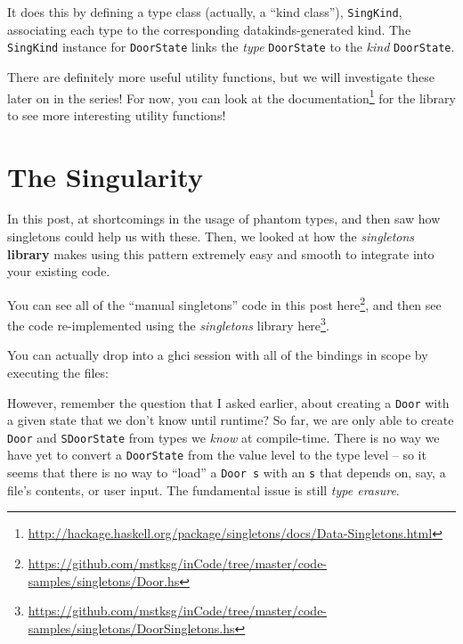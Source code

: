 \documentclass[]{article}
\newenvironment{Shaded}{}{}
\newcommand{\ExtensionTok}[1]{#1}
\newcommand{\NormalTok}[1]{#1}
\renewcommand{\href}[2]{#2\footnote{\url{#1}}}
\begin{document}
It does this by defining a type class (actually, a ``kind class''),
\texttt{SingKind}, associating each type to the corresponding
datakinds-generated kind. The \texttt{SingKind} instance for \texttt{DoorState}
links the \emph{type} \texttt{DoorState} to the \emph{kind} \texttt{DoorState}.

There are definitely more useful utility functions, but we will investigate
these later on in the series! For now, you can look at the
\href{http://hackage.haskell.org/package/singletons/docs/Data-Singletons.html}{documentation}
for the library to see more interesting utility functions!

\section{The Singularity}\label{the-singularity}

In this post, at shortcomings in the usage of phantom types, and then saw how
singletons could help us with these. Then, we looked at how the
\emph{singletons} \textbf{library} makes using this pattern extremely easy and
smooth to integrate into your existing code.

You can see all of the ``manual singletons'' code in this post
\href{https://github.com/mstksg/inCode/tree/master/code-samples/singletons/Door.hs}{here},
and then see the code re-implemented using the \emph{singletons} library
\href{https://github.com/mstksg/inCode/tree/master/code-samples/singletons/DoorSingletons.hs}{here}.

You can actually drop into a ghci session with all of the bindings in scope by
executing the files:

\begin{Shaded}
\end{Shaded}

However, remember the question that I asked earlier, about creating a
\texttt{Door} with a given state that we don't know until runtime? So far, we
are only able to create \texttt{Door} and \texttt{SDoorState} from types we
\emph{know} at compile-time. There is no way we have yet to convert a
\texttt{DoorState} from the value level to the type level -- so it seems that
there is no way to ``load'' a \texttt{Door\ s} with an \texttt{s} that depends
on, say, a file's contents, or user input. The fundamental issue is still
\emph{type erasure}.
\end{document}
